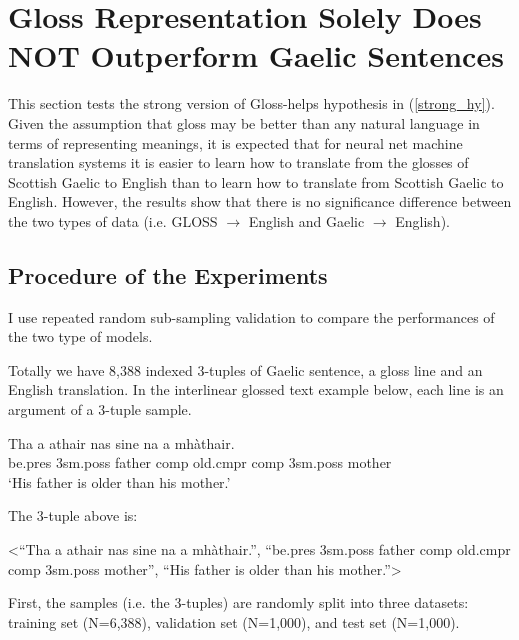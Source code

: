 \documentclass[a4paper]{article}
\begin{document}
\section{Gloss Representation Solely Does NOT Outperform Gaelic Sentences} \label{gd_to_gl_to_en}
This section tests the strong version of Gloss-helps hypothesis in (\ref{strong_hy}).
Given the assumption that gloss may be better than any natural language in terms of representing meanings, it is expected that for neural net machine translation systems it is easier to learn how to translate from the glosses of Scottish Gaelic to English than to learn how to translate from Scottish Gaelic to English. However, the results show that there is no significance difference between the two types of data (i.e. GLOSS $\rightarrow$ English and Gaelic $\rightarrow$ English). 

\subsection{Procedure of the Experiments}
I use repeated random sub-sampling validation to compare the performances of the two type of models.

Totally we have 8,388 indexed 3-tuples of Gaelic sentence, a gloss line and an English translation. In the interlinear glossed text example below, each line is an argument of a 3-tuple sample. 

\begin{exe}  
\ex \gll    Tha a athair nas sine na a mh\`athair.\\  
            be.pres 3sm.poss father comp old.cmpr comp 3sm.poss mother
\\  
    \glt    `His father is older than his mother.'  
\end{exe}

The 3-tuple above is:
\begin{exe}
 \ex <``Tha a athair nas sine na a mh\`athair.'', ``be.pres 3sm.poss father comp old.cmpr comp 3sm.poss mother'', ``His father is older than his mother.''>
\end{exe}

First, the samples (i.e. the 3-tuples) are randomly split into three datasets: training set (N=6,388), validation set (N=1,000), and test set (N=1,000). 
\end{document}
